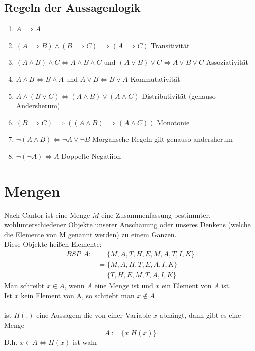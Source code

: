 \documentclass{article}
\begin{document}
        \subsection*{Regeln der Aussagenlogik}
            \begin{enumerate}
                \item $A\implies A$
                \item $(A\implies B) \land (B \implies C)\implies (A\implies C)$ Transitivität
                \item$(A\land B)\land C \iff A\land B\land C$ und $(A\lor B)\lor C \iff A\lor B\lor C$ Assoziativität
                \item $A\land B \iff B\land A$ und $A\lor B \iff B\lor A$ Kommutativität
                \item $A\land (B\lor C)\iff (A\land B) \lor (A\land C)$ Distributivität (genauso Andersherum) 
                \item $(B\implies C)\implies ((A\land B)\implies (A \land C))$  Monotonie
                \item $\lnot (A\land B)\iff \lnot A\lor \lnot B$  Morgansche Regeln gilt genauso andersherum 
                \item $\lnot(\lnot A)\iff A$ Doppelte Negatiion

            \end{enumerate}

    \section{Mengen}
        Nach Cantor ist eine Menge $M$ eine Zusammenfassung bestimmter, wohlunterschiedener Objekte unserer Anschauung oder unseres Denkens (welche die Elemente von M genannt werden) zu einem Ganzen.\\
        Diese Objekte heißen Elemente:
        \begin{align*}
            BSP \:\:A:&=\{M,A,T,H,E,M,A,T,I,K\}\\
            \,&=\{M,A,H,T,E,A,I,K\}\\
            \,&=\{T,H,E,M,T,A,I,K\}
        \end{align*}
        Man schreibt $x\in A $, wenn $A$ eine Menge ist und $x$ ein Element von $A$ ist.\\
        Ist $x$ kein Element von A, so schriebt man $x\notin A$\\\\
        ist $H(.)$ eine Aussagem die von einer Variable $x$ abhängt, dann gibt es eine Menge 
        $$A:=\{x|H(x)\}$$
        D.h. $x\in A\iff H(x)$ ist wahr\\
\end{document}
